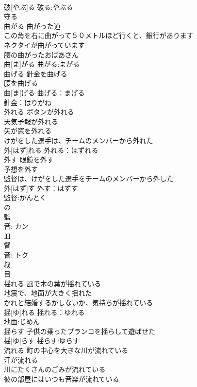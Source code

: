 \documentclass[8pt]{extreport}
\begin{document}
\begin{CJK}{UTF8}{min}
\\	破[やぶ]る			破る:やぶる
\\	守る 
\\	曲がる	曲がった道 
\\	この角を右に曲がって５０メトルほど行くと、銀行があります 
\\	ネクタイが曲がっています 
\\	腰の曲がったおばあさん 
\\	曲[ま]がる			曲がる:まがる
\\	曲げる	針金を曲げる 
\\	腰を曲げる 
\\	曲[ま]げる			曲げる：まげる
\\	針金：はりがね
\\	外れる	ボタンが外れる 
\\	天気予報が外れる 
\\	矢が窓を外れる 
\\	けがをした選手は、チームのメンバーから外れた 
\\	外[はず]れる			外れる：はずれる
\\	外す	眼鏡を外す 
\\	予想を外す 
\\	監督は、けがをした選手をチームのメンバーから外した 
\\	外[はず]す			外す：はずす
\\	監督:かんとく
\\	の 
\\	監 
\\	音: カン 
\\	皿 
\\	督 
\\	音: トク 
\\	叔 
\\	目 
\\	揺れる	風で木の葉が揺れている 
\\	地震で、地面が大きく揺れた 
\\	かれと結婚するかしないか、気持ちが揺れている 
\\	揺[ゆ]れる			揺れる：ゆれる
\\	地面:じめん
\\	揺らす	子供の乗ったブランコを揺らして遊ばせた 
\\	揺[ゆ]らす			揺らす:ゆらす
\\	流れる	町の中心を大きな川が流れている 
\\	汗が流れる 
\\	川にたくさんのごみが流れている 
\\	彼の部屋にはいつも音楽が流れている 

\end{CJK}
\end{document}
